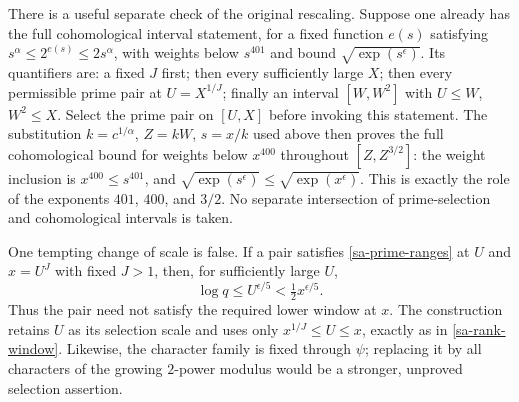 There is a useful separate check of the original rescaling. Suppose
one already has the full cohomological interval statement, for a fixed
function $e(s)$ satisfying
$s^\alpha\le2^{e(s)}\le2s^\alpha$, with weights below $s^{401}$
and bound $\sqrt{\exp(s^\epsilon)}$. Its quantifiers are:
a fixed $J$ first; then every sufficiently large $X$; then every
permissible prime pair at $U=X^{1/J}$; finally an interval
$[W,W^2]$ with $U\le W$, $W^2\le X$.
Select the prime pair on $[U,X]$ before invoking this statement.
The substitution $k=c^{1/\alpha}$, $Z=kW$, $s=x/k$ used above
then proves the full cohomological bound for weights below $x^{400}$
throughout $[Z,Z^{3/2}]$: the weight inclusion is
$x^{400}\le s^{401}$, and
$\sqrt{\exp(s^\epsilon)}\le\sqrt{\exp(x^\epsilon)}$.
This is exactly the role of the exponents $401$, $400$, and $3/2$.
No separate intersection of prime-selection and cohomological
intervals is taken.

One tempting change of scale is false. If a pair satisfies
\eqref{sa-prime-ranges} at $U$ and $x=U^J$ with fixed $J>1$,
then, for sufficiently large $U$,
\[
          \log q\le U^{\epsilon/5}
                <\tfrac12 x^{\epsilon/5}.
\]
Thus the pair need not satisfy the required lower window at $x$.
The construction retains $U$ as its selection scale and uses only
$x^{1/J}\le U\le x$, exactly as in
\eqref{sa-rank-window}. Likewise, the character family is fixed
through $\psi$; replacing it by all characters of the growing
$2$-power modulus would be a stronger, unproved selection assertion.


